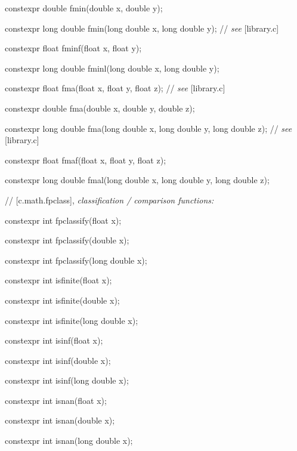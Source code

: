 \documentclass[prd,twocolumn,amsmath,amssymb,nofootinbib,eqsecnum]{revtex4-1}
\newcommand{\highlight}[1]{{\color{red} #1}}
\newcommand{\stdcomment}[1]{{// {\it see} [#1]}}
\begin{document}
{\highlight{constexpr}  double fmin(double x, double y);

\highlight{constexpr}  long double fmin(long double x, long double y); \stdcomment{library.c}

\highlight{constexpr}  float fminf(float x, float y);

\highlight{constexpr} long double fminl(long double x, long double y);

\vspace{2ex}

\highlight{constexpr}  float fma(float x, float y, float z); \stdcomment{library.c}

\highlight{constexpr}  double fma(double x, double y, double z);

\highlight{constexpr}  long double fma(long double x, long double y, long double z); \stdcomment{library.c}

\highlight{constexpr}  float fmaf(float x, float y, float z);

\highlight{constexpr}  long double fmal(long double x, long double y, long double z);

\vspace{2ex}

// [c.math.fpclass], {\it classification / comparison functions:}

\highlight{constexpr} int fpclassify(float x);

\highlight{constexpr} int fpclassify(double x);

\highlight{constexpr} int fpclassify(long double x);

\vspace{2ex}

\highlight{constexpr} int isfinite(float x);

\highlight{constexpr} int isfinite(double x);

\highlight{constexpr} int isfinite(long double x);

\vspace{2ex}

\highlight{constexpr} int isinf(float x);

\highlight{constexpr} int isinf(double x);

\highlight{constexpr} int isinf(long double x);

\vspace{2ex}

\highlight{constexpr} int isnan(float x);

\highlight{constexpr} int isnan(double x);

\highlight{constexpr} int isnan(long double x);

}
\end{document}
